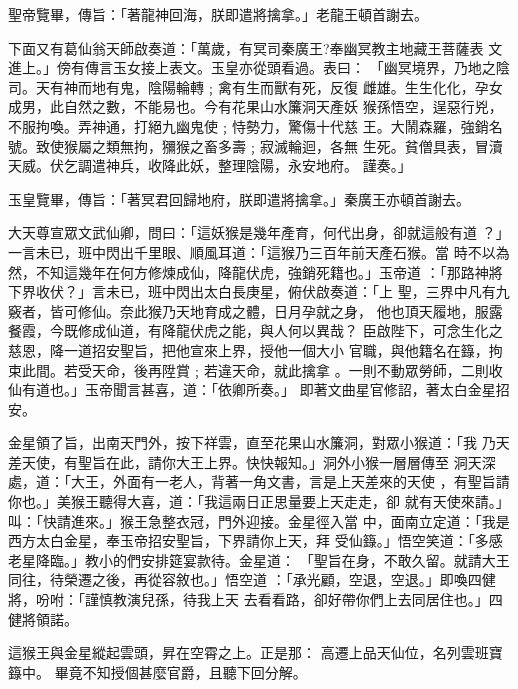 \begin{pinyinscope}
{聖帝覽畢，傳旨：「著龍神回海，朕即遣將擒拿。」老龍王頓首謝去。

下面又有葛仙翁天師啟奏道：「萬歲，有冥司秦廣王?奉幽冥教主地藏王菩薩表
文進上。」傍有傳言玉女接上表文。玉皇亦從頭看過。表曰：
「幽冥境界，乃地之陰司。天有神而地有鬼，陰陽輪轉﹔禽有生而獸有死，反復
雌雄。生生化化，孕女成男，此自然之數，不能易也。今有花果山水簾洞天產妖
猴孫悟空，逞惡行兇，不服拘喚。弄神通，打絕九幽鬼使﹔恃勢力，驚傷十代慈
王。大鬧森羅，強銷名號。致使猴屬之類無拘，獼猴之畜多壽﹔寂滅輪迴，各無
生死。貧僧具表，冒瀆天威。伏乞調遣神兵，收降此妖，整理陰陽，永安地府。
謹奏。」

玉皇覽畢，傳旨：「著冥君回歸地府，朕即遣將擒拿。」秦廣王亦頓首謝去。

大天尊宣眾文武仙卿，問曰：「這妖猴是幾年產育，何代出身，卻就這般有道
？」一言未已，班中閃出千里眼、順風耳道：「這猴乃三百年前天產石猴。當
時不以為然，不知這幾年在何方修煉成仙，降龍伏虎，強銷死籍也。」玉帝道
：「那路神將下界收伏？」言未已，班中閃出太白長庚星，俯伏啟奏道：「上
聖，三界中凡有九竅者，皆可修仙。奈此猴乃天地育成之體，日月孕就之身，
他也頂天履地，服露餐霞，今既修成仙道，有降龍伏虎之能，與人何以異哉？
臣啟陛下，可念生化之慈恩，降一道招安聖旨，把他宣來上界，授他一個大小
官職，與他籍名在籙，拘束此間。若受天命，後再陞賞﹔若違天命，就此擒拿
。一則不動眾勞師，二則收仙有道也。」玉帝聞言甚喜，道：「依卿所奏。」
即著文曲星官修詔，著太白金星招安。

金星領了旨，出南天門外，按下祥雲，直至花果山水簾洞，對眾小猴道：「我
乃天差天使，有聖旨在此，請你大王上界。快快報知。」洞外小猴一層層傳至
洞天深處，道：「大王，外面有一老人，背著一角文書，言是上天差來的天使
，有聖旨請你也。」美猴王聽得大喜，道：「我這兩日正思量要上天走走，卻
就有天使來請。」叫：「快請進來。」猴王急整衣冠，門外迎接。金星徑入當
中，面南立定道：「我是西方太白金星，奉玉帝招安聖旨，下界請你上天，拜
受仙籙。」悟空笑道：「多感老星降臨。」教小的們安排筵宴款待。金星道：
「聖旨在身，不敢久留。就請大王同往，待榮遷之後，再從容敘也。」悟空道
：「承光顧，空退，空退。」即喚四健將，吩咐：「謹慎教演兒孫，待我上天
去看看路，卻好帶你們上去同居住也。」四健將領諾。

這猴王與金星縱起雲頭，昇在空霄之上。正是那：
    高遷上品天仙位，名列雲班寶籙中。
    畢竟不知授個甚麼官爵，且聽下回分解。





}
\end{pinyinscope}
